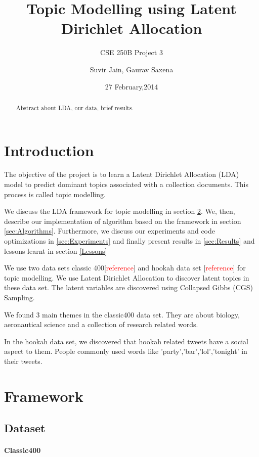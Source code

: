 \documentclass[11pt,a4paper,oneside]{article}
\title{Topic Modelling using Latent Dirichlet Allocation}
\subtitle{CSE 250B Project 3}
\author{Suvir Jain, Gaurav Saxena}
\date{27 February,2014}
\def\red{\textcolor{red}}
\begin{document}
\maketitle

\begin{abstract}
Abstract about LDA, our data, brief results.
\end{abstract}

\section{Introduction}

The objective of the project is to learn a Latent Dirichlet Allocation (LDA) model to predict dominant topics associated with a collection documents. This process is called topic modelling.

We discuss the LDA framework for topic modelling in section \ref{sec:Framework}. We, then, describe our implementation of algorithm based on the framework in section \ref{sec:Algorithms}. Furthermore, we discuss our experiments and code optimizations in \ref{sec:Experiments} and finally present results in \ref{sec:Results} and lessons learnt in section \ref{Lessons}

We use two data sets classic 400[\red{reference}] and hookah data set [\red{reference}] for topic modelling. We use Latent Dirichlet Allocation to discover latent topics in these data set. The latent variables are discovered using Collapsed Gibbs (CGS) Sampling.

We found 3 main themes in the classic400 data set. They are about biology, aeronautical science and a collection of research related words. 

In the hookah data set, we discovered that hookah related tweets have a social aspect to them. People commonly used words like 'party','bar','lol','tonight'  in their tweets.

\section{Framework}
\label{sec:Framework}

\subsection{Dataset}

\paragraph{Classic400}
\end{document}
